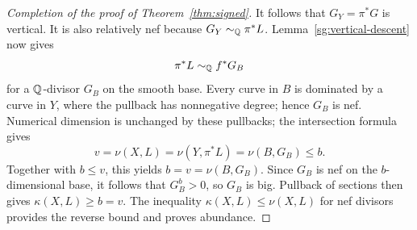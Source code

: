 \begin{proof}[Completion of the proof of Theorem~\ref{thm:signed}]
It follows that $G_Y=\pi^*G$ is vertical.  It is also
relatively nef because $G_Y\sim_{\mathbb{Q}}\pi^*L$.
Lemma~\ref{sg:vertical-descent} now gives
\[
 \pi^*L\sim_{\mathbb{Q}}f^*G_B
\]
for a $\mathbb{Q}$-divisor $G_B$ on the smooth base.  Every
curve in $B$ is dominated by a curve in $Y$, where
the pullback has nonnegative degree; hence $G_B$ is
nef.  Numerical dimension is unchanged by these pullbacks;
the intersection formula gives
\[
 v=\nu(X,L)=\nu(Y,\pi^*L)=\nu(B,G_B)\le b.
\]
Together with $b\le v$, this yields $b=v=\nu(B,G_B)$.
Since $G_B$ is nef on the $b$-dimensional base, it follows
that $G_B^b>0$, so $G_B$ is big.  Pullback of
sections then gives $\kappa(X,L)\ge b=v$.  The
inequality $\kappa(X,L)\le\nu(X,L)$ for nef divisors
provides the reverse bound and proves abundance.
\end{proof}

